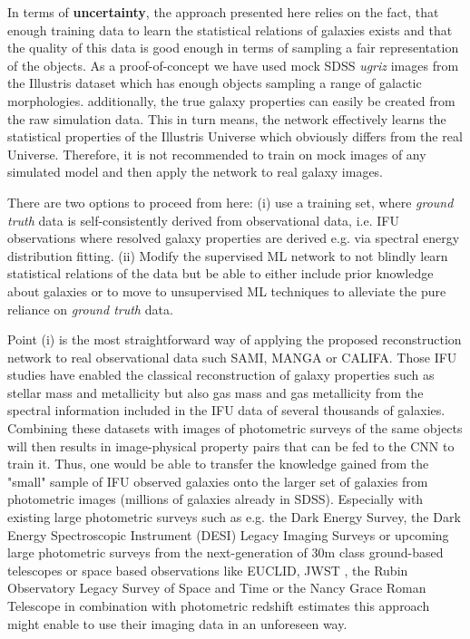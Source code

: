\documentclass[conference]{IEEEtran}
\begin{document}
In terms of \textbf{uncertainty}, the approach presented here relies on the fact, that enough training data to learn the statistical relations of galaxies exists and that the quality of this data is good enough in terms of sampling a fair representation of the objects. As a proof-of-concept we have used mock SDSS \emph{ugriz} images from the Illustris dataset which has enough objects sampling a range of galactic morphologies. additionally, the true galaxy properties can easily be created from the raw simulation data. This in turn means, the network effectively learns the statistical properties of the Illustris Universe which obviously differs from the real Universe. Therefore, it is not recommended to train on mock images of any simulated model and then apply the network to real galaxy images.

There are two options to proceed from here: (i) use a training set, where \emph{ground truth} data is self-consistently derived from observational data, i.e. IFU observations where resolved galaxy properties are derived e.g. via spectral energy distribution fitting. (ii) Modify the supervised ML network to not blindly learn statistical relations of the data but be able to either include prior knowledge about galaxies or to move to unsupervised ML techniques to alleviate the pure reliance on \emph{ground truth} data.
 
Point (i) is the most straightforward way of applying the proposed reconstruction network to real observational data such SAMI, MANGA or CALIFA. Those IFU studies have enabled the classical reconstruction of galaxy properties such as stellar mass and metallicity but also gas mass and gas metallicity from the spectral information included in the  IFU data of several thousands of galaxies. Combining these datasets with images of photometric surveys of the same objects will then results in image-physical property pairs that can be fed to the CNN to train it. Thus, one would be able to transfer the knowledge gained from the "small" sample of IFU observed galaxies onto the larger set of galaxies from photometric images (millions of galaxies already in SDSS). Especially with existing large photometric surveys such as e.g. the Dark Energy Survey, the Dark Energy Spectroscopic Instrument (DESI) Legacy Imaging Surveys or upcoming large photometric surveys from the next-generation of 30m class ground-based telescopes or space based observations like EUCLID, JWST \citep{jwst}, the Rubin Observatory Legacy Survey of Space and Time or the Nancy Grace Roman Telescope in combination with photometric redshift estimates \citep[e.g.][]{Henghes2021} this approach might enable to use their imaging data in an unforeseen way.  
\end{document}
